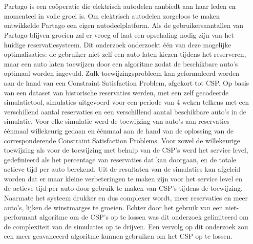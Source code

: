 \chapter*{}
Partago is een coöperatie die elektrisch autodelen aanbiedt aan haar leden en momenteel in volle groei is. Om elektrisch autodelen zorgeloos te maken ontwikkelde Partago een eigen autodeelplatform. Als de gebruikersaantallen van Partago blijven groeien zal er vroeg of laat een opschaling nodig zijn van het huidige reservatiesysteem. Dit onderzoek onderzoekt één van deze mogelijke optimalisaties: de gebruiker niet zelf een auto laten kiezen tijdens het reserveren, maar een auto laten toewijzen door een algoritme zodat de beschikbare auto's optimaal worden ingevuld. Zulk toewijzingsprobleem kan geformuleerd worden aan de hand van een Constraint Satisfaction Problem, afgekort tot CSP. Op basis van een dataset van historische reservaties werden, met een zelf gecodeerde simulatietool, simulaties uitgevoerd voor een periode van 4 weken telkens met een verschillend aantal reservaties en een verschillend aantal beschikbare auto's in de simulatie. Voor elke simulatie werd de toewijzing van auto's aan reservaties éénmaal willekeurig gedaan en éénmaal aan de hand van de oplossing van de corresponderende Constraint Satisfaction Problems. Voor zowel de willekeurige toewijzing als voor de toewijzing met behulp van de CSP's werd het service level, gedefinieerd als het percentage van reservaties dat kan doorgaan, en de totale actieve tijd per auto berekend. Uit de resultaten van de simulaties kan afgeleid worden dat er maar kleine verbeteringen te maken zijn voor het service level en de actieve tijd per auto door gebruik te maken van CSP's tijdens de toewijzing. Naarmate het systeem drukker en dus complexer wordt, meer reservaties en meer auto's, lijken de winstmarges te groeien. Echter door het gebruik van een niet-performant algoritme om de CSP's op te lossen was dit onderzoek gelimiteerd om de complexiteit van de simulaties op te drijven. Een vervolg op dit onderzoek zou een meer geavanceerd algoritme kunnen gebruiken om het CSP op te lossen.
